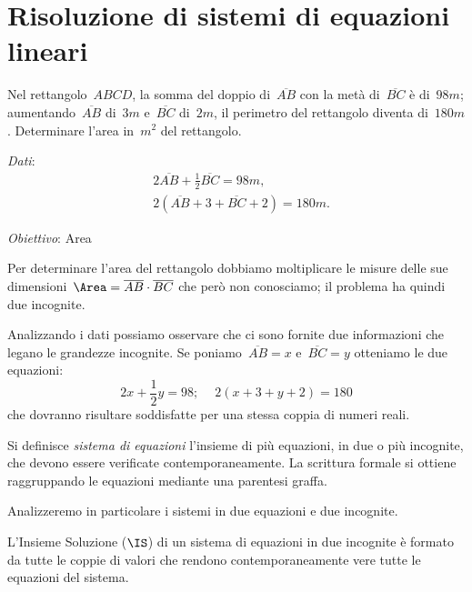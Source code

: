 \section{Risoluzione di sistemi di equazioni lineari}
\begin{problema}
\label{pr:19.1}
Nel rettangolo~$ABCD$, la somma del doppio di~$\overline{AB}$ con la metà di~$\overline{BC}$ è
di~$98\unit{m}$; aumentando~$\overline{AB}$ di~$3\unit{m}$ e~$\overline{BC}$ di~$2\unit{m}$, il perimetro del rettangolo
diventa di~$180\unit{m}$. Determinare l'area in~$\unit{m}^{2}$ del rettangolo.
\end{problema}
\begin{multicols}{2}
\emph{Dati}:
\begin{align*}
&2\overline{AB}+\frac{1}{2}\overline{BC}=98\unit{m}\text{,}\\
&2(\overline{AB}+3+\overline{BC}+2)=180\unit{m}.
\end{align*}

\emph{Obiettivo}: Area

\begin{center}
 
\end{center}
\end{multicols}
 \begin{soluzione}
Per determinare l'area del rettangolo dobbiamo
moltiplicare le misure delle sue dimensioni~$\Area=\overline{AB}\cdot\overline{BC}$
che però non conosciamo; il problema ha quindi due incognite.

Analizzando i dati possiamo osservare che ci sono fornite due
informazioni che legano le grandezze incognite. Se poniamo~$\overline{AB}=x$ e~$\overline{BC}=y$
otteniamo le due equazioni:
\[2x+\frac{1}{2}y=98;\quad~2(x+3+y+2)=180\]
che dovranno risultare soddisfatte per una stessa coppia di numeri
reali.
 \end{soluzione}

 \begin{definizione}
Si definisce \emph{sistema di equazioni} l'insieme di più equazioni, in due o più incognite,
che devono essere verificate contemporaneamente. La scrittura formale
si ottiene raggruppando le equazioni mediante una parentesi graffa.
\end{definizione}

Analizzeremo in particolare i sistemi in due equazioni e due incognite.

\begin{definizione}
L'Insieme Soluzione ($\IS$) di un sistema di equazioni in
due incognite è formato da tutte le coppie di valori
che rendono contemporaneamente vere tutte le equazioni del sistema.
\end{definizione}

